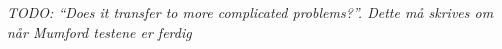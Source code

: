 \emph{\color{blue} TODO: ``Does it transfer to more complicated problems?''. Dette må skrives om når Mumford testene er ferdig}



